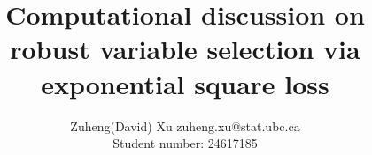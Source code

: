 \documentclass[11pt]{article}
\begin{document}
\title{Computational discussion on robust variable selection via exponential square loss}

\author{\name Zuheng(David) Xu \email zuheng.xu@stat.ubc.ca \\
       \addr Student number: 24617185\\}      


\maketitle















\newpage




\newpage
\appendix
\end{document}
